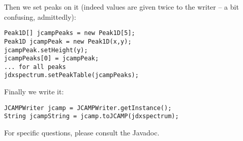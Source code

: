 \documentclass[a4paper]{book}
\begin{document}
Then we set peaks on it (indeed values are given twice to the writer – a bit
confusing, admittedly):

\begin{verbatim}
Peak1D[] jcampPeaks = new Peak1D[5];
Peak1D jcampPeak = new Peak1D(x,y);
jcampPeak.setHeight(y);
jcampPeaks[0] = jcampPeak;
... for all peaks
jdxspectrum.setPeakTable(jcampPeaks);
\end{verbatim}

Finally we write it:

\begin{verbatim}
JCAMPWriter jcamp = JCAMPWriter.getInstance();
String jcampString = jcamp.toJCAMP(jdxspectrum);
\end{verbatim}

For specific questions, please consult the Javadoc.
\end{document}
